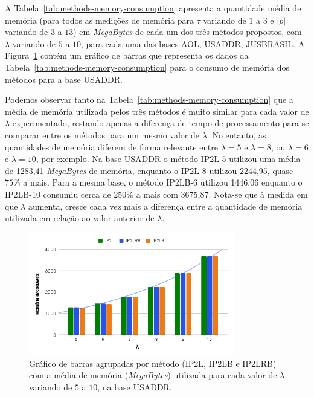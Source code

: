 A Tabela~\ref{tab:methods-memory-consumption} apresenta a quantidade média de memória (para todos as medições de memória para $\tau$ variando de $1$ a $3$ e $|p|$ variando de $3$ a $13$) em \textit{MegaBytes} de cada um dos três métodos propostos, com $\lambda$ variando de $5$ a $10$, para cada uma das bases AOL, USADDR, JUSBRASIL. A Figura~\ref{fig:memory_consumption_usaddr} contém um gráfico de barras que representa os dados da Tabela~\ref{tab:methods-memory-consumption} para o consumo de memória dos métodos para a base USADDR.

Podemos observar tanto na Tabela~\ref{tab:methods-memory-consumption} que a média de memória utilizada pelos três métodos é muito similar para cada valor de $\lambda$ experimentado, restando apenas a diferença de tempo de processamento para se comparar entre os métodos para um mesmo valor de $\lambda$. No entanto, as quantidades de memória diferem de forma relevante entre $\lambda=5$ e $\lambda=8$, ou $\lambda=6$ e $\lambda=10$, por exemplo. Na base USADDR o método IP2L-5 utilizou uma média de 1283,41 \textit{MegaBytes} de memória, enquanto o IP2L-8 utilizou 2244,95, quase $75\%$ a mais. Para a mesma base, o método IP2LB-6 utilizou 1446,06 enquanto o IP2LB-10 consumiu cerca de $250\%$ a mais com 3675,87. Nota-se que à medida em que $\lambda$ aumenta, cresce cada vez mais a diferença entre a quantidade de memória utilizada em relação ao valor anterior de $\lambda$. 

\begin{figure} [h]
    \centering
    \includegraphics[width=0.80\textwidth]{figures/memory_usaddr.png}
    \caption{Gráfico de barras agrupadas por método (IP2L, IP2LB e IP2LRB) com a média de memória (\textit{MegaBytes}) utilizada para cada valor de $\lambda$ variando de $5$ a $10$, na base USADDR.}
    \label{fig:memory_consumption_usaddr}
\end{figure}

